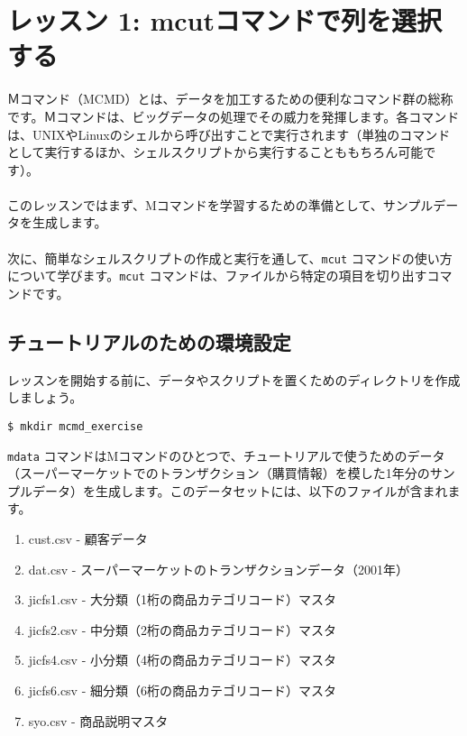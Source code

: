 

%


\section{レッスン 1: mcutコマンドで列を選択する}

{Ｍコマンド（MCMD）とは、データを加工するための便利なコマンド群の総称です。Ｍコマンドは、ビッグデータの処理でその威力を発揮します。各コマンドは、UNIXやLinuxのシェルから呼び出すことで実行されます（単独のコマンドとして実行するほか、シェルスクリプトから実行することももちろん可能です）。
\\ 
\\
このレッスンではまず、Mコマンドを学習するための準備として、サンプルデータを生成します。
\\
\\
次に、簡単なシェルスクリプトの作成と実行を通して、\verb|mcut| コマンドの使い方について学びます。\verb|mcut| コマンドは、ファイルから特定の項目を切り出すコマンドです。 }

\subsection{チュートリアルのための環境設定}

レッスンを開始する前に、データやスクリプトを置くためのディレクトリを作成しましょう。\\

\begin{verbatim}
$ mkdir mcmd_exercise
\end{verbatim}

\verb|mdata| コマンドはMコマンドのひとつで、チュートリアルで使うためのデータ（スーパーマーケットでのトランザクション（購買情報）を模した1年分のサンプルデータ）を生成します。このデータセットには、以下のファイルが含まれます。\\

\begin{enumerate}
 	\item cust.csv - 顧客データ
 	\item dat.csv - スーパーマーケットのトランザクションデータ（2001年）
	\item jicfs1.csv - 大分類（1桁の商品カテゴリコード）マスタ
	\item jicfs2.csv - 中分類（2桁の商品カテゴリコード）マスタ
	\item jicfs4.csv - 小分類（4桁の商品カテゴリコード）マスタ
	\item jicfs6.csv - 細分類（6桁の商品カテゴリコード）マスタ
	\item syo.csv - 商品説明マスタ
\end{enumerate}

